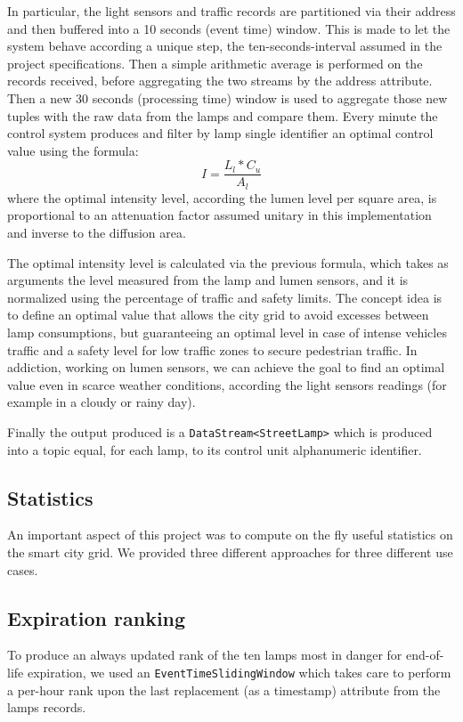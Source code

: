 In particular, the light sensors and traffic records are partitioned via their address and then buffered into a 10 seconds (event time) window. This is made to let the system behave according a unique step, the ten-seconds-interval assumed in the project specifications. Then a simple arithmetic average is performed on the records received, before aggregating the two streams by the address attribute. Then a new 30 seconds (processing time) window is used to aggregate those new tuples with the raw data from the lamps and compare them. Every minute the control system produces and filter by lamp single identifier an optimal control value using the formula:
	$$I = \frac{L_l*C_u}{A_l}$$
where the optimal intensity level, according the lumen level per square area, is proportional to an attenuation factor assumed unitary in this implementation and inverse to the diffusion area.

The optimal intensity level is calculated via the previous formula, which takes as arguments the level measured from the lamp and lumen sensors, and it is normalized using the percentage of traffic and safety limits. The concept idea is to define an optimal value that allows the city grid to avoid excesses between lamp consumptions, but guaranteeing an optimal level in case of intense vehicles traffic and a safety level for low traffic zones to secure pedestrian traffic. In addiction, working on lumen sensors, we can achieve the goal to find an optimal value even in scarce weather conditions, according the light sensors readings (for example in a cloudy or rainy day).

Finally the output produced is a \texttt{DataStream<StreetLamp>} which is produced into a topic equal, for each lamp, to its control unit alphanumeric identifier.

\subsection{Statistics}
An important aspect of this project was to compute on the fly useful statistics on the smart city grid. We provided three different approaches for three different use cases.
\subsection*{Expiration ranking}
To produce an always updated rank of the ten lamps most in danger for end-of-life expiration, we used an \texttt{EventTimeSlidingWindow} which takes care to perform a per-hour rank upon the last replacement (as a timestamp) attribute from the lamps records.
